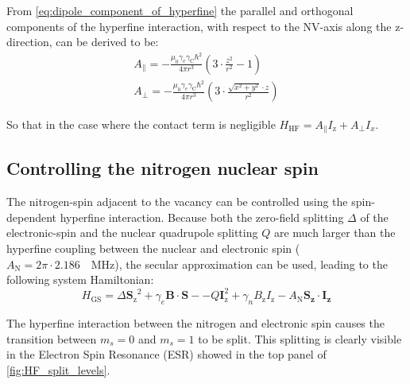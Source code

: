 From \cref{eq:dipole_component_of_hyperfine}  the parallel and orthogonal components of the hyperfine interaction, with respect to the NV-axis along the z-direction, can be derived to be:
 \begin{align}
A_\parallel= - \frac{\mu_0 \gamma_e \gamma_{\mathrm{C}} \hbar^2 }{4 \pi r^3} \left(3\cdot \frac{z^2}{r^2}-1\right)\\
 A_\perp =  -\frac{\mu_0 \gamma_e \gamma_{\mathrm{C}} \hbar^2 }{4 \pi r^3}\left( 3\cdot\frac{\sqrt{x^2+y^2}\cdot z}{r^2}\right)
\end{align}

So that in the case where the contact term is negligible $H_{\mathrm{HF}} = A_\parallel I_\mathrm{z} + A_\perp I_x $.

\subsection{Controlling the nitrogen nuclear spin}
The nitrogen-spin adjacent to the vacancy can be controlled using the spin-dependent hyperfine interaction.
Because both the zero-field splitting $\Delta$ of the electronic-spin and the nuclear quadrupole splitting $Q$ are much larger than the hyperfine coupling between the nuclear and electronic spin ($A_\mathrm{N} = 2\pi \cdot 2.186\quad \mathrm{MHz} $), the secular approximation can be used, leading to the following system Hamiltonian:
\begin{equation}
        H_\mathrm{GS} = \Delta {\bm{S}_\mathrm{z}}^2 + \gamma_e \bm{B} \cdot \bm{S} -  -Q\bm{I}_{\mathrm{z}}^2+\gamma_{n} B_\mathrm{z} I_\mathrm{z} - A_\mathrm{N} \bm{S_z}\cdot \bm{I_z}
\end{equation}

The hyperfine interaction between the nitrogen and electronic spin causes the transition between $m_s=0$ and $m_s =1$ to be split.
This splitting is clearly visible in the Electron Spin Resonance (ESR) showed in the top panel of \cref{fig:HF_split_levels}.


